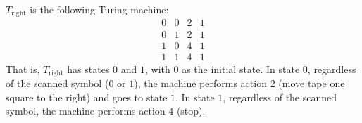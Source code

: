 $T_{\text{right}}$ is the following Turing machine:
\[
\begin{array}{cccc}
0 & 0 & 2 & 1 \\
0 & 1 & 2 & 1 \\
1 & 0 & 4 & 1 \\
1 & 1 & 4 & 1
\end{array}
\]
That is, $T_{\text{right}}$ has states $0$ and $1$, with $0$ as the initial state. In state $0$, regardless of the scanned symbol ($0$ or $1$), the machine performs action $2$ (move tape one square to the right) and goes to state $1$. In state $1$, regardless of the scanned symbol, the machine performs action $4$ (stop).
